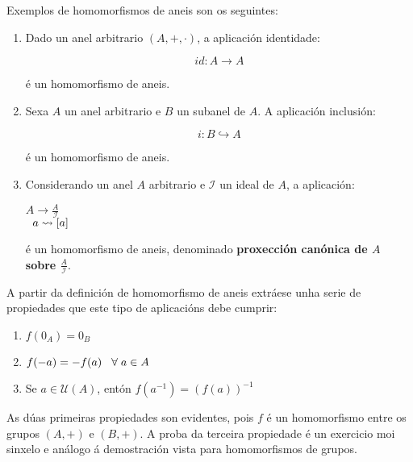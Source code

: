 \documentclass[twoside]{report}
\theoremstyle{mystyle}
\begin{document}
\noindent Exemplos de homomorfismos de aneis son os seguintes:\\

\begin{enumerate}
    \item Dado un anel arbitrario $(A, +, \cdot)$, a aplicación identidade:
    
        $$ id: A \longrightarrow A $$
        
        é un homomorfismo de aneis.
        
    \item Sexa $A$ un anel arbitrario e $B$ un subanel de $A$. A aplicación inclusión:
    
        $$ i: B \hookrightarrow A $$
        
        é un homomorfismo de aneis.
        
    \item Considerando un anel $A$ arbitrario e $\mathcal{I}$ un ideal de $A$, a aplicación:
    
        \begin{center}
            $A \longrightarrow \displaystyle \frac{A}{\mathcal{I}}$\\
            \vspace{2mm}
            $\hspace{2mm} a \leadsto [a]$
        \end{center}
        
        é un homomorfismo de aneis, denominado \textbf{proxección canónica de $A$ sobre $\displaystyle \frac{A}{\mathcal{I}}$}.\\
    
\end{enumerate}

\noindent A partir da definición de homomorfismo de aneis extráese unha serie de propiedades que este tipo de aplicacións debe cumprir:

\begin{enumerate}
    \item $f(0_{A}) = 0_{B}$
    \item $f(-a) = -f(a) \hspace{3mm} \forall \hspace{1mm} a \in A$
    \item Se $a \in \mathcal{U}(A)$, entón $f(a^{-1}) = (f(a))^{-1}$
\end{enumerate}

\noindent As dúas primeiras propiedades son evidentes, pois $f$ é un homomorfismo entre os grupos $(A,+)$ e $(B,+)$. A proba da terceira propiedade é un exercicio moi sinxelo e análogo á demostración vista para homomorfismos de grupos.
\end{document}

